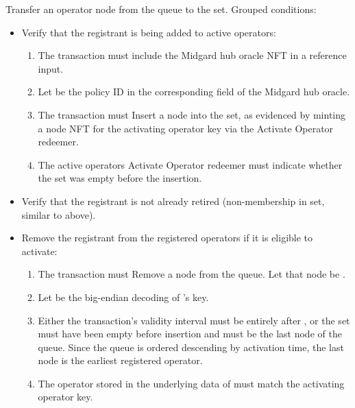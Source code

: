 \documentclass[../midgard.tex]{subfiles}
\begin{document}
\begin{description}
\begin{itemize}
        \end{itemize}
    \item[Activate Operator.] Transfer an operator node from the  queue to the  set.
      Grouped conditions:
        \begin{itemize}
            \item Verify that the registrant is being added to active operators:
                \begin{enumerate}[resume]
                    \item The transaction must include the Midgard hub oracle NFT in a reference input.
                    \item Let  be the policy ID in the corresponding field of the Midgard hub oracle.
                    \item The transaction must Insert a node into the  set, as evidenced by minting a  node NFT for the activating operator key via the Activate Operator redeemer.
                    \item The active operators Activate Operator redeemer must indicate whether the  set was empty before the insertion.
                \end{enumerate}
            \item Verify that the registrant is not already retired (non-membership in  set, similar to above).
            \item Remove the registrant from the registered operators if it is eligible to activate:
            \begin{enumerate}
                \item The transaction must Remove a node from the  queue.
                  Let that node be .
                \item Let  be the big-endian decoding of 's key.
                \item Either the transaction's validity interval must be entirely after , or the  set must have been empty before insertion and  must be the last node of the  queue.
                  Since the queue is ordered descending by activation time, the last node is the earliest registered operator.
                \item The operator stored in the underlying data of  must match the activating operator key.

\end{enumerate}
\end{itemize}
\end{description}
\end{document}
